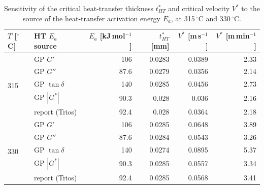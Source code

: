 \begin{table}[htbp]
\centering
\caption{Sensitivity of the critical heat-transfer thickness $t_{HT}^*$ and critical velocity $V^*$ to the source of the heat-transfer activation energy $E_a$, at 315\,$^\circ$C and 330\,$^\circ$C.}
\label{tab:ht-sensitivity}
\begin{tabular}{llrrrr}
\toprule
$T$ [$^\circ$C] & HT $E_a$ source & $E_a$ [kJ\,mol$^{-1}$] & $t_{HT}^*$ [mm] & $V^*$ [m\,s$^{-1}$] & $V^*$ [m\,min$^{-1}$] \\
\midrule
\multirow[t]{5}{*}{315} & GP $G'$ & 106 & 0.0283 & 0.0389 & 2.33 \\
 & GP $G''$ & 87.6 & 0.0279 & 0.0356 & 2.14 \\
 & GP $\tan\delta$ & 140 & 0.0285 & 0.0456 & 2.73 \\
 & GP $|G^*|$ & 90.3 & 0.028 & 0.036 & 2.16 \\
 & report (Trios) & 92.4 & 0.028 & 0.0364 & 2.18 \\
\midrule
\multirow[t]{5}{*}{330} & GP $G'$ & 106 & 0.0285 & 0.0648 & 3.89 \\
 & GP $G''$ & 87.6 & 0.0284 & 0.0543 & 3.26 \\
 & GP $\tan\delta$ & 140 & 0.0274 & 0.0895 & 5.37 \\
 & GP $|G^*|$ & 90.3 & 0.0285 & 0.0557 & 3.34 \\
 & report (Trios) & 92.4 & 0.0285 & 0.0568 & 3.41 \\
\bottomrule
\end{tabular}
\end{table}
